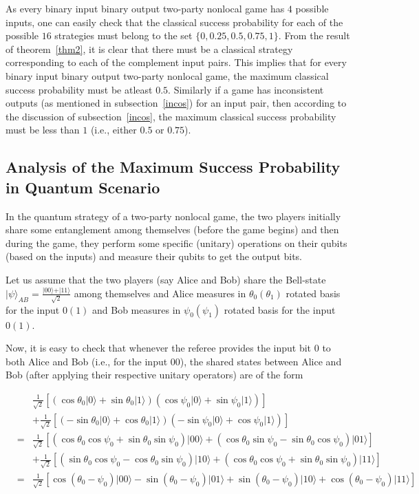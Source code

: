 \documentclass[]{svjour3}
\begin{document}
As every binary input binary output two-party nonlocal game has $4$ possible inputs, one can easily check that the classical success probability for each of the possible $16$ strategies must belong to the set $\{0, 0.25, 0.5, 0.75, 1\}$. From the result of theorem~\ref{thm2}, it is clear that there must be a classical strategy corresponding to each of the complement input pairs. This implies that for every binary input binary output two-party nonlocal game, the maximum classical success probability must be atleast $0.5$. Similarly if a game has inconsistent outputs (as mentioned in subsection~\ref{incos}) for an input pair, then according to the discussion of subsection~\ref{incos}, the maximum classical success probability must be less than $1$ (i.e., either $0.5$ or $0.75$). 

\subsection{Analysis of the Maximum Success Probability in Quantum Scenario}
\label{quant}

In the quantum strategy of a two-party nonlocal game, the two players initially share some entanglement among themselves (before the game begins) and then during the game, they perform some specific (unitary) operations on their qubits (based on the inputs) and measure their qubits to get the output bits.

Let us assume that the two players (say Alice and Bob) share the Bell-state $\vert \psi \rangle _{AB} = \frac{\vert 00 \rangle + \vert 11 \rangle }{\sqrt{2}}$ among themselves and Alice measures in $\theta_0 (\theta_1)$ rotated basis for the input $0 (1)$ and Bob measures in $\psi_0 (\psi_1)$ rotated basis for the input $0 (1)$. 

Now, it is easy to check that whenever the referee provides the input bit $0$ to both Alice and Bob (i.e., for the input $00$), the shared states between Alice and Bob (after applying their respective unitary operators) are of the form

\begin{eqnarray*}
	&&\frac{1}{\sqrt{2}}\left[(\cos{\theta_0}\vert0\rangle + \sin{\theta_0}\vert1\rangle)(\cos{\psi_0}\vert0\rangle + \sin{\psi_0}\vert1\rangle)\right] \\
	&~&+\frac{1}{\sqrt{2}}\left[(-\sin{\theta_0}\vert0\rangle+\cos{\theta_0}\vert1\rangle)(-\sin{\psi_0}\vert0\rangle+\cos{\psi_0}\vert1\rangle)\right]\\
	&=&\frac{1}{\sqrt{2}}\left[(\cos{\theta_0}\cos{\psi_0}+\sin{\theta_0}\sin{\psi_0})\vert 00 \rangle  + (\cos{\theta_0}\sin{\psi_0}-\sin{\theta_0}\cos{\psi_0})\vert 01 \rangle \right]\\
	&~&+\frac{1}{\sqrt{2}}\left[(\sin{\theta_0}\cos{\psi_0}-\cos{\theta_0}\sin{\psi_0})\vert 10 \rangle  + (\cos{\theta_0}\cos{\psi_0}+\sin{\theta_0}\sin{\psi_0})\vert 11 \rangle \right]\\
	&=& \frac{1}{\sqrt{2}} \left[\cos(\theta_0-\psi_0)\vert 00 \rangle  - \sin(\theta_0-\psi_0)\vert 01 \rangle  + \sin(\theta_0-\psi_0)\vert 10 \rangle  + \cos(\theta_0-\psi_0)\vert 11 \rangle \right]
\end{eqnarray*}
\end{document}
